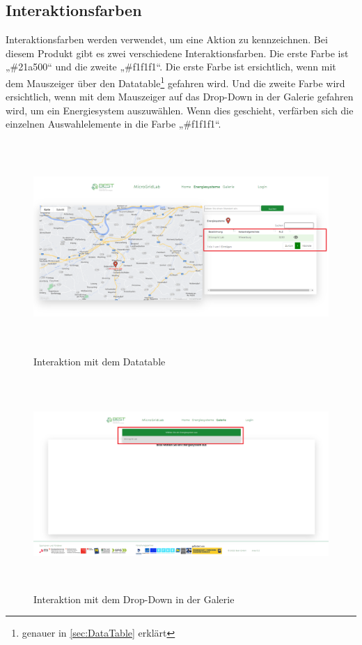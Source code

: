 \subsection{Interaktionsfarben}
Interaktionsfarben werden verwendet, um eine Aktion zu kennzeichnen. Bei diesem  Produkt gibt es zwei verschiedene Interaktionsfarben. Die erste Farbe ist „\#21a500“ und die zweite „\#f1f1f1“. Die erste Farbe ist ersichtlich, wenn mit dem Mauszeiger über den Datatable\footnote{genauer in \autoref{sec:DataTable} erklärt} gefahren wird. Und die zweite Farbe wird ersichtlich, wenn mit dem Mauszeiger auf das Drop-Down in der Galerie gefahren wird, um ein Energiesystem auszuwählen. Wenn dies geschieht, verfärben sich die einzelnen Auswahlelemente in die Farbe „\#f1f1f1“. 
\begin{figure}[h]
	\centering
	\includegraphics[height=8cm,width=15cm]{images/InteraktionDataTable}
	\caption{Interaktion mit dem Datatable}
	\label{fig: Interaktion mit dem Datatabel}
\end{figure}
\begin{figure}[h]
	\centering
	\includegraphics[height=8cm,width=15cm]{images/InteraktionDropDown}
	\caption{Interaktion mit dem Drop-Down in der Galerie}
	\label{fig: Interaktion mit dem Datatabel}
\end{figure}

